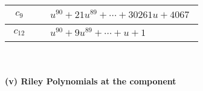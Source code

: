 \documentclass[1p]{elsarticle_modified}
\theoremstyle{definition}
\begin{document}
\begin{tabular}{m{50pt}|m{274pt}}
\hline $$\begin{aligned}c_{9}\end{aligned}$$&$\begin{aligned}
&u^{90}+21 u^{89}+\cdots+30261 u+4067
\end{aligned}$\\
\hline $$\begin{aligned}c_{12}\end{aligned}$$&$\begin{aligned}
&u^{90}+9 u^{89}+\cdots+u+1
\end{aligned}$\\
\hline
\end{tabular}\\~\\
\newpage\renewcommand{\arraystretch}{1}
\flushleft \textbf{(v) Riley Polynomials at the component}\newline \\
\end{document}
